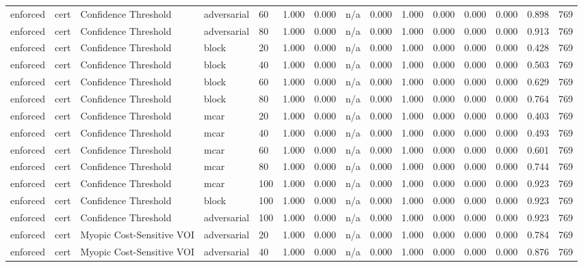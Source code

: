 \begin{table}[!ht]
{\begin{tabular}{lllllllllllllll}
enforced & cert & Confidence Threshold & adversarial & 60 & 1.000 & 0.000 & n/a & 0.000 & 1.000 & 0.000 & 0.000 & 0.000 & 0.898 & 769 \\
enforced & cert & Confidence Threshold & adversarial & 80 & 1.000 & 0.000 & n/a & 0.000 & 1.000 & 0.000 & 0.000 & 0.000 & 0.913 & 769 \\
enforced & cert & Confidence Threshold & block & 20 & 1.000 & 0.000 & n/a & 0.000 & 1.000 & 0.000 & 0.000 & 0.000 & 0.428 & 769 \\
enforced & cert & Confidence Threshold & block & 40 & 1.000 & 0.000 & n/a & 0.000 & 1.000 & 0.000 & 0.000 & 0.000 & 0.503 & 769 \\
enforced & cert & Confidence Threshold & block & 60 & 1.000 & 0.000 & n/a & 0.000 & 1.000 & 0.000 & 0.000 & 0.000 & 0.629 & 769 \\
enforced & cert & Confidence Threshold & block & 80 & 1.000 & 0.000 & n/a & 0.000 & 1.000 & 0.000 & 0.000 & 0.000 & 0.764 & 769 \\
enforced & cert & Confidence Threshold & mcar & 20 & 1.000 & 0.000 & n/a & 0.000 & 1.000 & 0.000 & 0.000 & 0.000 & 0.403 & 769 \\
enforced & cert & Confidence Threshold & mcar & 40 & 1.000 & 0.000 & n/a & 0.000 & 1.000 & 0.000 & 0.000 & 0.000 & 0.493 & 769 \\
enforced & cert & Confidence Threshold & mcar & 60 & 1.000 & 0.000 & n/a & 0.000 & 1.000 & 0.000 & 0.000 & 0.000 & 0.601 & 769 \\
enforced & cert & Confidence Threshold & mcar & 80 & 1.000 & 0.000 & n/a & 0.000 & 1.000 & 0.000 & 0.000 & 0.000 & 0.744 & 769 \\
enforced & cert & Confidence Threshold & mcar & 100 & 1.000 & 0.000 & n/a & 0.000 & 1.000 & 0.000 & 0.000 & 0.000 & 0.923 & 769 \\
enforced & cert & Confidence Threshold & block & 100 & 1.000 & 0.000 & n/a & 0.000 & 1.000 & 0.000 & 0.000 & 0.000 & 0.923 & 769 \\
enforced & cert & Confidence Threshold & adversarial & 100 & 1.000 & 0.000 & n/a & 0.000 & 1.000 & 0.000 & 0.000 & 0.000 & 0.923 & 769 \\
enforced & cert & Myopic Cost-Sensitive VOI & adversarial & 20 & 1.000 & 0.000 & n/a & 0.000 & 1.000 & 0.000 & 0.000 & 0.000 & 0.784 & 769 \\
enforced & cert & Myopic Cost-Sensitive VOI & adversarial & 40 & 1.000 & 0.000 & n/a & 0.000 & 1.000 & 0.000 & 0.000 & 0.000 & 0.876 & 769 \\

\end{tabular}}
\end{table}
